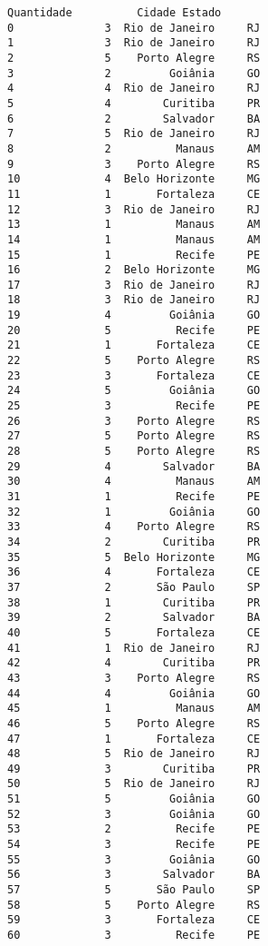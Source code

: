 \documentclass[11pt]{article}
\begin{document}
\begin{Verbatim}[commandchars=\\\{\}]
      Quantidade          Cidade Estado  
0              3  Rio de Janeiro     RJ  
1              3  Rio de Janeiro     RJ  
2              5    Porto Alegre     RS  
3              2         Goiânia     GO  
4              4  Rio de Janeiro     RJ  
5              4        Curitiba     PR  
6              2        Salvador     BA  
7              5  Rio de Janeiro     RJ  
8              2          Manaus     AM  
9              3    Porto Alegre     RS  
10             4  Belo Horizonte     MG  
11             1       Fortaleza     CE  
12             3  Rio de Janeiro     RJ  
13             1          Manaus     AM  
14             1          Manaus     AM  
15             1          Recife     PE  
16             2  Belo Horizonte     MG  
17             3  Rio de Janeiro     RJ  
18             3  Rio de Janeiro     RJ  
19             4         Goiânia     GO  
20             5          Recife     PE  
21             1       Fortaleza     CE  
22             5    Porto Alegre     RS  
23             3       Fortaleza     CE  
24             5         Goiânia     GO  
25             3          Recife     PE  
26             3    Porto Alegre     RS  
27             5    Porto Alegre     RS  
28             5    Porto Alegre     RS  
29             4        Salvador     BA  
30             4          Manaus     AM  
31             1          Recife     PE  
32             1         Goiânia     GO  
33             4    Porto Alegre     RS  
34             2        Curitiba     PR  
35             5  Belo Horizonte     MG  
36             4       Fortaleza     CE  
37             2       São Paulo     SP  
38             1        Curitiba     PR  
39             2        Salvador     BA  
40             5       Fortaleza     CE  
41             1  Rio de Janeiro     RJ  
42             4        Curitiba     PR  
43             3    Porto Alegre     RS  
44             4         Goiânia     GO  
45             1          Manaus     AM  
46             5    Porto Alegre     RS  
47             1       Fortaleza     CE  
48             5  Rio de Janeiro     RJ  
49             3        Curitiba     PR  
50             5  Rio de Janeiro     RJ  
51             5         Goiânia     GO  
52             3         Goiânia     GO  
53             2          Recife     PE  
54             3          Recife     PE  
55             3         Goiânia     GO  
56             3        Salvador     BA  
57             5       São Paulo     SP  
58             5    Porto Alegre     RS  
59             3       Fortaleza     CE  
60             3          Recife     PE  

\end{Verbatim}
\end{document}
